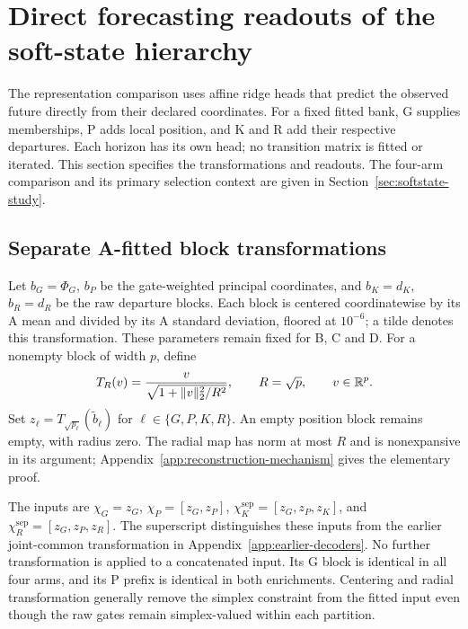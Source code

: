 \section{Direct forecasting readouts of the soft-state hierarchy}
\label{sec:bounded-decoder}

The representation comparison uses affine ridge heads that predict
the observed future directly from their declared coordinates.
For a fixed fitted bank, G supplies memberships, P adds local position,
and K and R add their respective departures. Each horizon has its
own head; no transition matrix is fitted or iterated. This section
specifies the transformations and readouts. The four-arm comparison
and its primary selection context are given in
Section~\ref{sec:softstate-study}.

\subsection{Separate A-fitted block transformations}

Let $b_G=\Phi_G$, $b_P$ be the gate-weighted principal coordinates,
and $b_K=d_K$, $b_R=d_R$ be the raw departure blocks. Each block
is centered coordinatewise by its A mean and divided by its A
standard deviation, floored at $10^{-6}$; a tilde denotes this
transformation. These parameters remain fixed for B, C and D.
For a nonempty block of width $p$, define
\begin{equation}
 T_R(v)=\frac{v}{\sqrt{1+\|v\|_2^2/R^2}},
 \qquad R=\sqrt p,\qquad v\in\mathbb{R}^p.
 \label{eq:mechanism-main-radial}
\end{equation}
Set $z_\ell=T_{\sqrt{p_\ell}}(\widetilde b_\ell)$ for
$\ell\in\{G,P,K,R\}$. An empty position block remains empty, with
radius zero. The radial map has norm at most $R$ and is
nonexpansive in its argument; Appendix~\ref{app:reconstruction-mechanism}
gives the elementary proof.

The inputs are $\chi_G=z_G$, $\chi_P=[z_G,z_P]$,
$\chi_K^{\mathrm{sep}}=[z_G,z_P,z_K]$, and
$\chi_R^{\mathrm{sep}}=[z_G,z_P,z_R]$. The superscript distinguishes
these inputs from the earlier joint-common transformation in
Appendix~\ref{app:earlier-decoders}. No further transformation is
applied to a concatenated input. Its G block is identical in all
four arms, and its P prefix is identical in both enrichments.
Centering and radial transformation generally remove the simplex
constraint from the fitted input even though the raw gates remain
simplex-valued within each partition.

